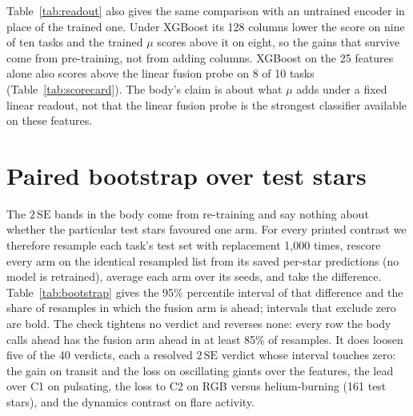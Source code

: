 \documentclass{article}
\begin{document}
Table~\ref{tab:readout} also gives the same comparison with an untrained encoder in place of the
trained one. Under XGBoost its 128 columns lower the score on nine of ten tasks and the trained $\mu$
scores above it on eight, so the gains that survive come from pre-training, not from adding columns.
XGBoost on the 25 features alone also scores above the linear fusion probe on 8 of 10 tasks
(Table~\ref{tab:scorecard}). The body's claim is about what $\mu$ adds under a fixed linear readout,
not that the linear fusion probe is the strongest classifier available on these features.

\section{Paired bootstrap over test stars}
\label{app:bootstrap}

The $2\,\mathrm{SE}$ bands in the body come from re-training and say nothing about whether the
particular test stars favoured one arm. For every printed contrast we therefore resample each task's
test set with replacement 1{,}000 times, rescore every arm on the identical resampled list from its
saved per-star predictions (no model is retrained), average each arm over its seeds, and take the
difference. Table~\ref{tab:bootstrap} gives the 95\% percentile interval of that difference and the
share of resamples in which the fusion arm is ahead; intervals that exclude zero are bold. The check
tightens no verdict and reverses none: every row the body calls ahead has the fusion arm ahead in at
least 85\% of resamples. It does loosen five of the 40 verdicts, each a resolved $2\,\mathrm{SE}$
verdict whose interval touches zero: the gain on transit and the loss on oscillating giants over the
features, the lead over C1 on
pulsating, the loss to C2 on RGB versus helium-burning (161 test stars), and the dynamics contrast on
flare activity.

\begin{table}[H]
\caption{Paired star-bootstrap of the four contrasts the body counts. Each entry is the 95\% interval
of (left arm $-$ right arm) over 1{,}000 resamples of the test stars, seeds averaged, and the share of
resamples with the difference above zero ($f_{>0}$; 1.00 means the left arm is ahead in every
resample, 0.00 that it is behind in every resample). Bold: interval excludes zero.}
\label{tab:bootstrap}
\centering
\scriptsize
\setlength{\tabcolsep}{2pt}

\end{table}
\end{document}
